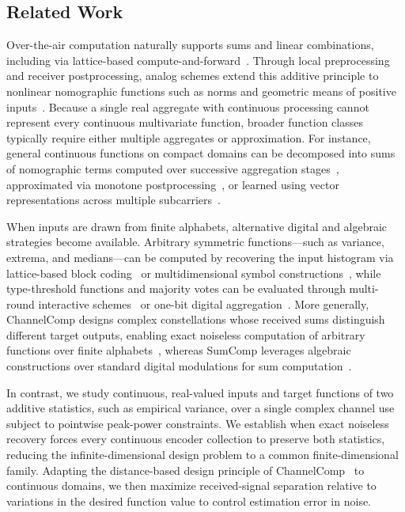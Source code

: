 \documentclass[journal,12pt,onecolumn,draftclsnofoot]{IEEEtran}
\begin{document}
\subsection{Related Work}

Over-the-air computation naturally supports sums and linear combinations, including via lattice-based compute-and-forward~\cite{nazer2007,nazer2011}. Through local preprocessing and receiver postprocessing, analog schemes extend this additive principle to nonlinear nomographic functions such as norms and geometric means of positive inputs~\cite{golden2013harnessing,goldenbaum2015}. Because a single real aggregate with continuous processing cannot represent every continuous multivariate function, broader function classes typically require either multiple aggregates or approximation. For instance, general continuous functions on compact domains can be decomposed into sums of nomographic terms computed over successive aggregation stages~\cite{goldenbaum2015}, approximated via monotone postprocessing~\cite{limmer2015}, or learned using vector representations across multiple subcarriers~\cite{bouzinis2024}.

When inputs are drawn from finite alphabets, alternative digital and algebraic strategies become available. Arbitrary symmetric functions—such as variance, extrema, and medians—can be computed by recovering the input histogram via lattice-based block coding~\cite{jeon2014} or multidimensional symbol constructions~\cite{sahin2026generic}, while type-threshold functions and majority votes can be evaluated through multi-round interactive schemes~\cite{wang2015} or one-bit digital aggregation~\cite{zhu2021onebit}. More generally, ChannelComp designs complex constellations whose received sums distinguish different target outputs, enabling exact noiseless computation of arbitrary functions over finite alphabets~\cite{channelcomp2024}, whereas SumComp leverages algebraic constructions over standard digital modulations for sum computation~\cite{sumcomp2025,towards2025}.

In contrast, we study continuous, real-valued inputs and target functions of two additive statistics, such as empirical variance, over a single complex channel use subject to pointwise peak-power constraints. We establish when exact noiseless recovery forces every continuous encoder collection to preserve both statistics, reducing the infinite-dimensional design problem to a common finite-dimensional family. Adapting the distance-based design principle of ChannelComp~\cite{channelcomp2024} to continuous domains, we then maximize received-signal separation relative to variations in the desired function value to control estimation error in noise.
\end{document}
